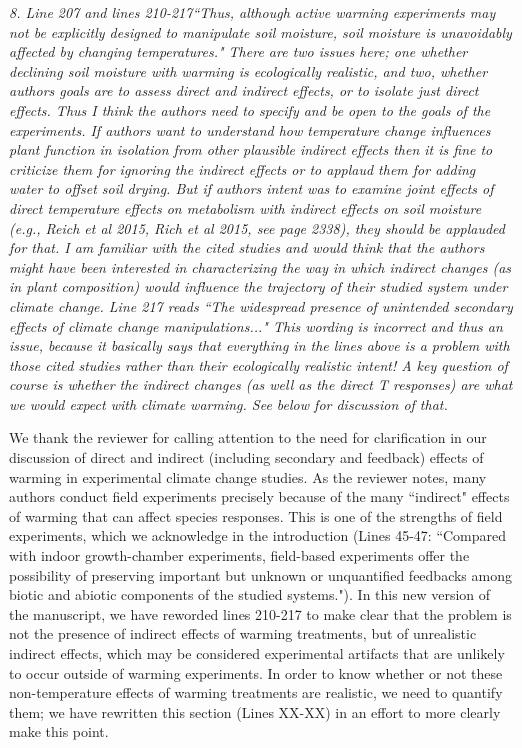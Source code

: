 \documentclass[11pt,a4paper]{letter}
\begin{document}
\par \emph{8. Line 207 and lines 210-217``Thus, although active warming experiments may not be explicitly designed to manipulate soil
moisture, soil moisture is unavoidably affected by changing temperatures." There are two issues here; one whether declining soil moisture with warming is ecologically
realistic, and two, whether authors goals are to assess direct and indirect effects, or to isolate
just direct effects. Thus I think the authors need to specify and be open to the goals of the
experiments. If authors want to understand how temperature change influences plant function
in isolation from other plausible indirect effects then it is fine to criticize them for ignoring the
indirect effects or to applaud them for adding water to offset soil drying. But if authors intent
was to examine joint effects of direct temperature effects on metabolism with indirect effects
on soil moisture (e.g., Reich et al 2015, Rich et al 2015, see page 2338), they should be
applauded for that. I am familiar with the cited studies and would think that the authors might
have been interested in characterizing the way in which indirect changes (as in plant
composition) would influence the trajectory of their studied system under climate change.
Line 217 reads ``The widespread presence of unintended secondary effects of climate change
manipulations..." This wording is incorrect and thus an issue, because it basically says that everything in the lines
above is a problem with those cited studies rather than their ecologically realistic intent! A key
question of course is whether the indirect changes (as well as the direct T responses) are what
we would expect with climate warming. See below for discussion of that.}

We thank the reviewer for calling attention to the need for clarification in our discussion of direct and indirect (including secondary and feedback) effects of warming in experimental climate change studies. As the reviewer notes, many authors conduct field experiments precisely because of the many ``indirect" effects of warming that can affect species responses. This is one of the strengths of field experiments, which we acknowledge in the introduction (Lines 45-47: ``Compared with indoor growth-chamber experiments, field-based experiments offer the possibility of preserving important but unknown or unquantified feedbacks among biotic and abiotic components of the studied systems."). In this new version of the manuscript, we have reworded lines 210-217 to make clear that the problem is not the presence of indirect effects of warming treatments, but of unrealistic indirect effects, which may be considered experimental artifacts that are unlikely to occur outside of warming experiments. In order to know whether or not these non-temperature effects of warming treatments are realistic, we need to quantify them; we have rewritten this section (Lines XX-XX) in an effort to more clearly make this point.
\end{document}
